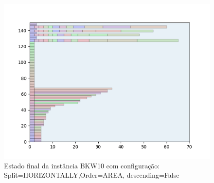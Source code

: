 \begin{figure}[H]
    \centering
    \caption[]{Estado final da instância BKW10 com configuração: Split=HORIZONTALLY,Order=AREA, descending=False}
    \label{fig:bkw10-horizontally-area-false}
    \includegraphics[scale=0.5]{output/figures/bkw/bkw10/horizontally/area/false/000}
\end{figure}